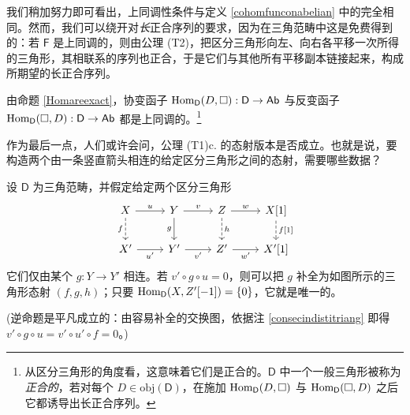 我们稍加努力即可看出，上同调性条件与定义 \ref{cohomfunconabelian} 中的完全相同。然而，我们可以绕开对\textit{长}正合序列的要求，因为在三角范畴中这是免费得到的：若 $\mathsf{F}$ 是上同调的，则由公理 (T2)，把区分三角形向左、向右各平移一次所得的三角形，其相联系的序列也正合，于是它们与其他所有平移副本链接起来，构成所期望的长正合序列。

由命题 \ref{Homareexact}，协变函子 $\textup{Hom}_\mathsf{D}(D,\square):\mathsf{D}\rightarrow\mathsf{Ab}$ 与反变函子 $\textup{Hom}_\mathsf{D}(\square,D):\mathsf{D}\rightarrow\mathsf{Ab}$ 都是上同调的。\footnote{从区分三角形的角度看，这意味着它们是正合的。$\mathsf{D}$ 中一个一般三角形被称为\textit{正合的}，若对每个 $D\in\text{obj}(\mathsf{D})$，在施加 $\textup{Hom}_\mathsf{D}(D,\square)$ 与 $\textup{Hom}_\mathsf{D}(\square,D)$ 之后它都诱导出长正合序列。}

\vspace*{0.5cm}

\noindent 作为最后一点，人们或许会问，公理 (T1)c. 的态射版本是否成立。也就是说，要构造两个由一条竖直箭头相连的给定区分三角形之间的态射，需要哪些数据？

\begin{Cor}
	设 $\mathsf{D}$ 为三角范畴，并假定给定两个区分三角形
	\[
	\begin{tikzcd}
		X\arrow[r,"u"]\arrow[d, dashed, "f"'] & Y \arrow[r,"v"]\arrow[d,"g"'] & Z \arrow[r, "w"]\arrow[d, dashed, "h"] & X[1]\arrow[d, dashed, "{f[1]}"] \\
		X'\arrow[r, "u'"'] & Y'\arrow[r, "v'"'] & Z'\arrow[r, "w'"'] & X'[1]
	\end{tikzcd}
	\]
	它们仅由某个 $g:Y\rightarrow Y'$ 相连。若 $v'\circ g\circ u=0$，则可以把 $g$ 补全为如图所示的三角形态射 $(f,g,h)$；只要 $\textup{Hom}_\mathsf{D}(X,Z'[-1])=\{0\}$，它就是唯一的。
	
	\textup(逆命题是平凡成立的：由容易补全的交换图，依据注 \ref{consecindistitriang} 即得 $v'\circ g\circ u=v'\circ u'\circ f=0$。\textup) 
\end{Cor}

